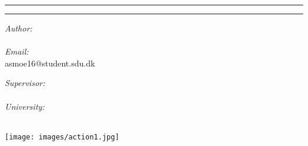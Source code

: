 \documentclass[../main.tex]{subfiles}
\begin{document}
\vspace{3cm}
\hrule
\begin{center}
	{\bf\Huge\Title}
\end{center}
\hrule
\begin{multicols}{2}
	\begin{flushleft}
		\textit{Author:} \\
		\Author\\
		\vspace{10pt}
		\textit{Email:} \\
		asmoe16@student.sdu.dk

	\end{flushleft}
	\columnbreak
	\begin{flushright}
		\textit{Supervisor:} \\
		\Supervisor \\
		\vspace{10pt} 
		\textit{University:}\\
		\University \\
	\end{flushright}
\end{multicols}

\begin{center}
	\texttt{[image: images/action1.jpg]}
\end{center}
\end{document}
